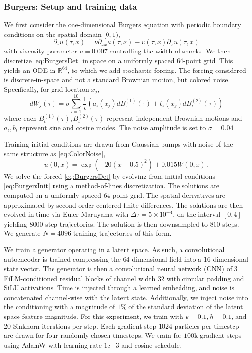 \documentclass[oneside,11pt]{article}
\theoremstyle{remark}
\newcommand{\R}{\mathbb{R}}
\begin{document}
\subsubsection{Burgers: Setup and training data}\label{subsec:BurgSetup}
We first consider the one-dimensional Burgers equation with periodic boundary conditions on the spatial domain $[0,1)$,
    \begin{equation}\label{eq:BurgersDet}
        \partial _\tau u(\tau,x) = \nu \partial_{xx}u(\tau,x)-u(\tau,x)\partial_xu(\tau,x)
    \end{equation}
    with viscosity parameter $\nu =0.007$ controlling the width of shocks. We then discretize \eqref{eq:BurgersDet} in space on a uniformly spaced 64-point grid. This yields an ODE in $\R^{64}$, to which we add stochastic forcing. The forcing considered is discrete-in-space and not a standard Brownian motion, but colored noise. Specifically, for grid location $x_j$,  \begin{equation}\label{eq:ColorNoise}
    dW_j(\tau) = \sigma\sum_{\iota=1}^{10} \frac{1}{\iota}(a_{\iota}(x_j)dB_{\iota}^{(1)}(\tau)+b_{\iota}(x_j)dB_{\iota}^{(2)}(\tau))
    \end{equation}
    where each $B_{\iota}^{(1)}(\tau),B_{\iota}^{(2)}(\tau)$ represent independent Brownian motions and $a_{\iota},b_{\iota}$ represent sine and cosine modes. The noise amplitude is set to $\sigma = 0.04$. 
    
    Training initial conditions are drawn from Gaussian bumps with noise of the same structure as \eqref{eq:ColorNoise},
    \begin{equation}\label{eq:BurgersInit}
    u(0,x) = \exp(-20(x-0.5)^2)+0.015W(0,x)\,.
    \end{equation}
    We solve the forced \eqref{eq:BurgersDet} by evolving from initial conditions \eqref{eq:BurgersInit} using a method-of-lines discretization.  The solutions are computed on a uniformly spaced 64-point grid. The spatial derivatives are approximated by second-order centered finite differences.
The solutions are then evolved in time via Euler-Maruyama with $\Delta \tau =5 \times 10^{-4}$, on the interval $[0,4]$ yielding $8000$ step trajectories. The solution is then downsampled to $800$ steps. We generate $N = 4096$ training trajectories of this form.

We train a generator operating in a latent space. As such, a convolutional autoencoder is trained compressing the $64$-dimensional field into a $16$-dimensional state vector. The generator is then a convolutional neural network (CNN) of 3 FiLM-conditioned residual blocks \cite{perez2018film} of channel width $32$ with circular padding and SiLU activations. Time is injected through a learned embedding, and noise is concatenated channel-wise with the latent state. Additionally, we inject noise into the conditioning with a magnitude of $1\%$ of the standard deviation of the latent space feature magnitude. For this experiment, we train with $\varepsilon=0.1,h=0.1$, and 20 Sinkhorn iterations per step. Each gradient step $1024$ particles per timestep are drawn for four randomly chosen timesteps. We train for $100$k gradient steps using AdamW with learning rate $1\mathrm{e}{-3}$ and cosine schedule.
\end{document}
